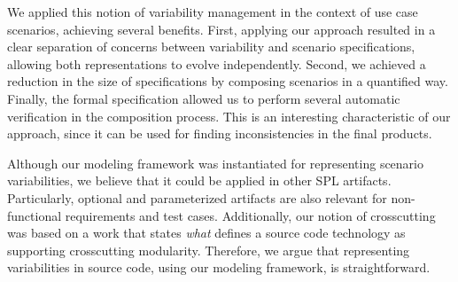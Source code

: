 \documentclass{acm_proc_article-sp}
\begin{document}
We applied this notion of variability management in the context of use 
case scenarios, achieving several benefits. First, applying our approach resulted in 
a clear separation of concerns between variability and scenario specifications, 
allowing both representations to evolve independently. Second, we achieved a reduction 
in the size of specifications by composing scenarios in a quantified way. Finally, the 
formal specification allowed us to perform several automatic verification in the composition 
process. This is an interesting characteristic of our approach, since it can be used 
for finding inconsistencies in the final products.

Although our modeling framework was instantiated for representing 
scenario variabilities, we believe that it could be applied in 
other SPL artifacts. Particularly, optional and parameterized artifacts 
are also relevant for non-functional requirements and test cases. 
Additionally, our notion of crosscutting was based on a work that states \emph{what} 
defines a source code technology as supporting crosscutting modularity. Therefore, 
we argue that representing variabilities in source code, using our modeling framework, 
is straightforward.   


%
%



\end{document}
